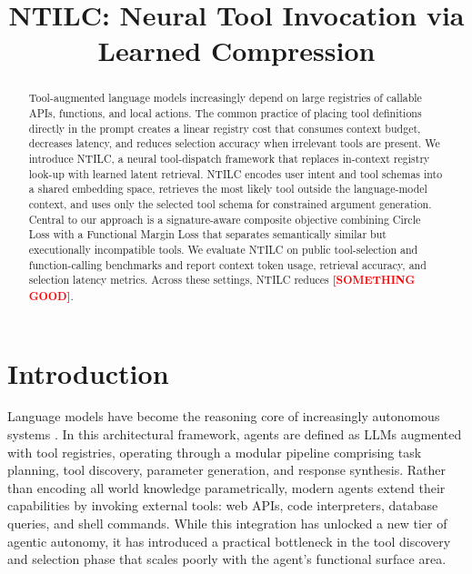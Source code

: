 \documentclass{article}
\title{NTILC: Neural Tool Invocation via Learned Compression}
\newcommand{\placeholder}[1]{\textcolor{red}{\textbf{[#1]}}}
\begin{document}
\maketitle

\begin{abstract}
Tool-augmented language models increasingly depend on large registries of callable APIs, functions, and local actions.
The common practice of placing tool definitions directly in the prompt creates a linear registry cost that consumes context budget, decreases latency, and reduces selection accuracy when irrelevant tools are present.
We introduce NTILC, a neural tool-dispatch framework that replaces in-context registry look-up with learned latent retrieval.
NTILC encodes user intent and tool schemas into a shared embedding space, retrieves the most likely tool outside the language-model context, and uses only the selected tool schema for constrained argument generation.
Central to our approach is a signature-aware composite objective combining Circle Loss with a Functional Margin Loss that separates semantically similar but executionally incompatible tools.
We evaluate NTILC on public tool-selection and function-calling benchmarks and report context token usage, retrieval accuracy, and selection latency metrics.
Across these settings, NTILC reduces \placeholder{SOMETHING GOOD}.
\end{abstract}

\section{Introduction}

Language models have become the reasoning core of increasingly autonomous systems \cite{li2025teachinglanguagemodelsreason, Plaat_2025, parisi2022talmtoolaugmentedlanguage}. In this architectural framework, agents are defined as LLMs augmented with tool registries, operating through a modular pipeline comprising task planning, tool discovery, parameter generation, and response synthesis. Rather than encoding all world knowledge parametrically, modern agents extend their capabilities by invoking external tools: web APIs, code interpreters, database queries, and shell commands. While this integration has unlocked a new tier of agentic autonomy, it has introduced a practical bottleneck in the tool discovery and selection phase that scales poorly with the agent’s functional surface area.
\end{document}
